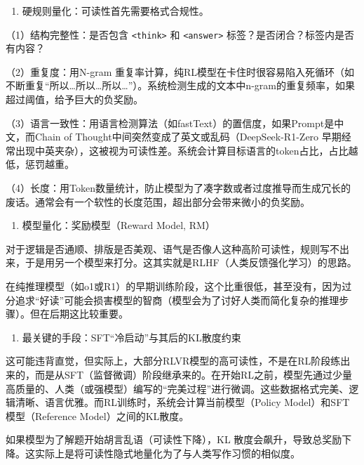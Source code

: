 \begin{enumerate}
\def\labelenumi{\arabic{enumi}.}
\tightlist
\item
  硬规则量化：可读性首先需要格式合规性。
\end{enumerate}

（1）结构完整性：是否包含 \texttt{\textless{}think\textgreater{}} 和 \texttt{\textless{}answer\textgreater{}} 标签？是否闭合？标签内是否有内容？

（2）重复度：用N-gram 重复率计算，纯RL模型在卡住时很容易陷入死循环（如不断重复``所以\ldots 所以\ldots 所以\ldots{}''）。系统检测生成的文本中n-gram的重复频率，如果超过阈值，给予巨大的负奖励。

（3）语言一致性：用语言检测算法（如fastText）的置信度，如果Prompt是中文，而Chain of Thought中间突然变成了英文或乱码（DeepSeek-R1-Zero 早期经常出现中英夹杂），这被视为可读性差。系统会计算目标语言的token占比，占比越低，惩罚越重。

（4）长度：用Token数量统计，防止模型为了凑字数或者过度推导而生成冗长的废话。通常会有一个软性的长度范围，超出部分会带来微小的负奖励。

\begin{enumerate}
\def\labelenumi{\arabic{enumi}.}
\setcounter{enumi}{1}
\tightlist
\item
  模型量化：奖励模型（Reward Model, RM）
\end{enumerate}

对于逻辑是否通顺、排版是否美观、语气是否像人这种高阶可读性，规则写不出来，于是用另一个模型来打分。这其实就是RLHF（人类反馈强化学习）的思路。

在纯推理模型（如o1或R1）的早期训练阶段，这个比重很低，甚至没有，因为过分追求``好读''可能会损害模型的智商（模型会为了讨好人类而简化复杂的推理步骤）。但在后期这比较重要。

\begin{enumerate}
\def\labelenumi{\arabic{enumi}.}
\setcounter{enumi}{2}
\tightlist
\item
  最关键的手段：SFT``冷启动''与其后的KL散度约束
\end{enumerate}

这可能违背直觉，但实际上，大部分RLVR模型的高可读性，不是在RL阶段练出来的，而是从SFT（监督微调）阶段继承来的。在开始RL之前，模型先通过少量高质量的、人类（或强模型）编写的``完美过程''进行微调。这些数据格式完美、逻辑清晰、语言优雅。而RL训练时，系统会计算当前模型（Policy Model）和SFT模型（Reference Model）之间的KL散度。

如果模型为了解题开始胡言乱语（可读性下降），KL 散度会飙升，导致总奖励下降。这实际上是将可读性隐式地量化为了与人类写作习惯的相似度。


